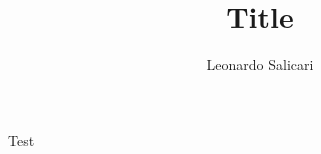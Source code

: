 \documentclass[a4paper]{article}
\title{Title}
\author{Leonardo Salicari}
\date{}
\begin{document}
\maketitle

Test \cite{adams2004}

\printbibliography
\end{document}
